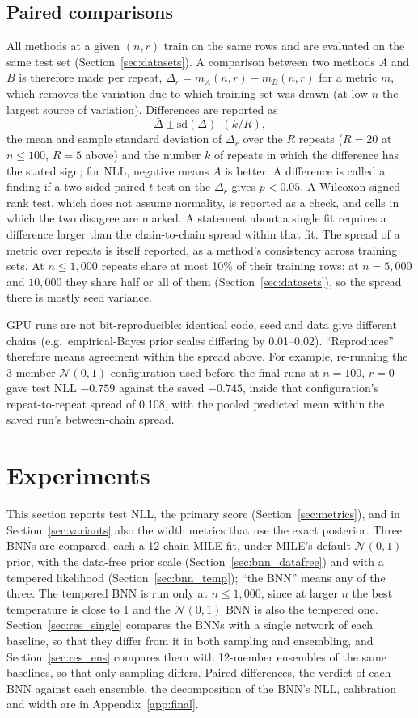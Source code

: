 \documentclass[11pt]{article}
\newcommand{\nzo}{\mathcal{N}(0,1)}
\begin{document}
\subsection{Paired comparisons}
\label{sec:paired}
All methods at a given $(n,r)$ train on the same rows and are evaluated on the same test set
(Section~\ref{sec:datasets}). A comparison between two methods $A$ and $B$ is therefore made per repeat,
$\Delta_r=m_A(n,r)-m_B(n,r)$ for a metric $m$, which removes the variation due to which training set was drawn
(at low $n$ the largest source of variation). Differences are reported as
\[
\bar\Delta\pm\mathrm{sd}(\Delta)\ \ (k/R),
\]
the mean and sample standard deviation of $\Delta_r$ over the $R$ repeats ($R=20$ at $n\le100$, $R=5$ above) and the
number $k$ of repeats in which the difference has the stated sign; for NLL, negative means $A$ is better. A difference
is called a finding if a two-sided paired $t$-test on the $\Delta_r$ gives $p<0.05$. A Wilcoxon signed-rank test, which
does not assume normality, is reported as a check, and cells in which the two disagree are marked. A statement about a
single fit requires a difference larger than the chain-to-chain spread within that fit. The spread of a metric over
repeats is itself reported, as a method's consistency across training sets. At $n\le1{,}000$ repeats share at most
10\% of their training rows; at $n=5{,}000$ and $10{,}000$ they share half or all of them (Section~\ref{sec:datasets}),
so the spread there is mostly seed variance. 

GPU runs are not bit-reproducible: identical code, seed and data give different chains (e.g.\ empirical-Bayes
prior scales differing by 0.01--0.02). ``Reproduces'' therefore means agreement within the spread above. For
example, re-running the 3-member $\nzo$ configuration used before the final runs at $n=100$, $r=0$ gave test NLL
$-0.759$ against the saved $-0.745$, inside that configuration's repeat-to-repeat spread of 0.108, with the pooled
predicted mean within the saved run's between-chain spread.

\section{Experiments}
\label{sec:experiments}
This section reports test NLL, the primary score (Section~\ref{sec:metrics}), and in
Section~\ref{sec:variants} also the width metrics that use the exact posterior. Three BNNs are compared, each a
12-chain MILE fit, under MILE's default $\mathcal N(0,1)$ prior, with the data-free prior scale
(Section~\ref{sec:bnn_datafree}) and with a tempered likelihood (Section~\ref{sec:bnn_temp}); ``the BNN'' means any of
the three. The tempered BNN is run only at $n\le1{,}000$, since at larger $n$ the best temperature is close to 1 and the
$\mathcal N(0,1)$ BNN is also the tempered one. Section~\ref{sec:res_single} compares the BNNs with a single network of
each baseline, so that they differ from it in both sampling and ensembling, and Section~\ref{sec:res_ens} compares them
with 12-member ensembles of the same baselines, so that only sampling differs. Paired differences, the verdict of each BNN against
each ensemble, the decomposition of the BNN's NLL, calibration and width are in Appendix~\ref{app:final}.
\end{document}

